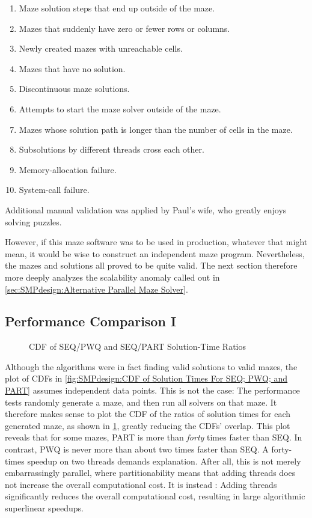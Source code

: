 \begin{enumerate}
\item	Maze solution steps that end up outside of the maze.
\item	Mazes that suddenly have zero or fewer rows or columns.
\item	Newly created mazes with unreachable cells.
\item	Mazes that have no solution.
\item	Discontinuous maze solutions.
\item	Attempts to start the maze solver outside of the maze.
\item	Mazes whose solution path is longer than the number of cells
	in the maze.
\item	Subsolutions by different threads cross each other.
\item	Memory-allocation failure.
\item	System-call failure.
\end{enumerate}

Additional manual validation was applied by Paul's wife, who greatly
enjoys solving puzzles.

However, if this maze software was to be used in production, whatever
that might mean, it would be wise to construct an independent maze
 program.
Nevertheless, the mazes and solutions all proved to be quite valid.
The next section therefore more deeply analyzes the scalability anomaly
called out in \cref{sec:SMPdesign:Alternative Parallel Maze Solver}.

\subsection{Performance Comparison I}
\label{sec:SMPdesign:Performance Comparison I}

\begin{figure}
\centering
{}
\caption{CDF of SEQ/PWQ and SEQ/PART Solution-Time Ratios}
\label{fig:SMPdesign:CDF of SEQ/PWQ and SEQ/PART Solution-Time Ratios}
\end{figure}

Although the algorithms were in fact finding valid solutions to valid
mazes, the plot of CDFs in
\cref{fig:SMPdesign:CDF of Solution Times For SEQ; PWQ; and PART}
assumes independent data points.
This is not the case:
The performance tests randomly generate a maze,
and then run all solvers on that maze.
It therefore makes sense to plot the CDF of the ratios of
solution times for each generated maze,
as shown in
\cref{fig:SMPdesign:CDF of SEQ/PWQ and SEQ/PART Solution-Time Ratios},
greatly reducing the CDFs' overlap.
This plot reveals that for some mazes, PART
is more than \emph{forty} times faster than SEQ\@.
In contrast, PWQ is never more than about
two times faster than SEQ\@.
A forty-times speedup on two threads demands explanation.
After all, this is not merely embarrassingly parallel, where partitionability
means that adding threads does not increase the overall computational cost.
It is instead \emph{}:
Adding threads significantly reduces the overall computational cost,
resulting in large algorithmic superlinear speedups.

